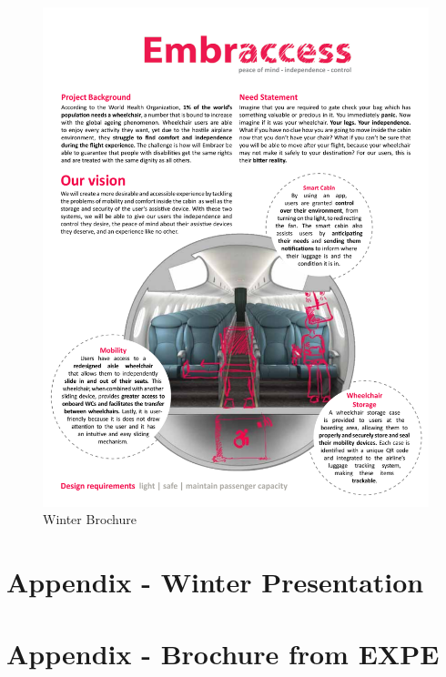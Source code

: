 \begin{figure}[h!]
	\centering
		\includegraphics[width=1\textwidth, page=2]{Figures/Winter_Brochure.pdf}
		\caption{Winter Brochure}
		\label{fig:wbrochure2}
\end{figure}

\chapter{Appendix - Winter Presentation}
\newpage


\chapter{Appendix - Brochure from EXPE}

